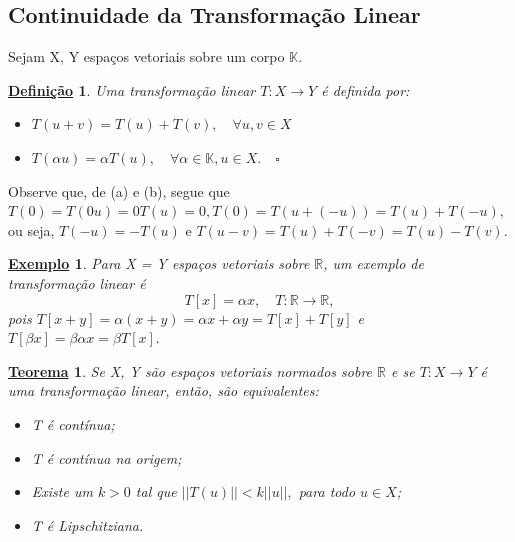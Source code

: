 \documentclass{article}
\newtheorem*{def*}{\underline{Defini\c c\~ao}}
\newtheorem*{theorem*}{\underline{Teorema}}
\newtheorem{example}{\underline{Exemplo}}
\begin{document}
\subsection{Continuidade da Transformação Linear}
  Sejam X, Y espaços vetoriais sobre um corpo \(\mathbb{K}\).
 \begin{def*}
   Uma transformação linear \(T:X\rightarrow Y\) é definida por:
 \begin{itemize}
   \item[a)] \(T(u+v)=T(u)+T(v),\quad \forall u, v\in X\)
   \item[b)] \(T(\alpha u) = \alpha T(u),\quad \forall \alpha \in \mathbb{K}, u\in X.\quad\square\)
 \end{itemize}
 \end{def*}
  Observe que, de (a) e (b), segue que \(T(0) = T(0u) = 0T(u) = 0, T(0) = T(u+(-u)) = T(u) + T(-u),\) ou seja,
 \(T(-u) = -T(u)\) e \(T(u-v) = T(u) + T(-v) = T(u) - T(v)\).
\begin{example}
  Para X = Y espaços vetoriais sobre \(\mathbb{R}\), um exemplo de transformação linear é 
    \[
      T[x] = \alpha x,\quad T:\mathbb{R}\rightarrow \mathbb{R},
    \]
    pois \(T[x+y] = \alpha (x+y) = \alpha x + \alpha y = T[x] + T[y]\) e \(T[\beta x] = \beta \alpha x = \beta T[x].\)
\end{example}
\begin{theorem*}
  Se X, Y são espaços vetoriais normados sobre \(\mathbb{R}\) e se \(T:X\rightarrow Y\) é uma transformação linear, então, são equivalentes:
 \begin{itemize}
   \item[a)] T é contínua;
   \item[b)] T é contínua na origem;
   \item[c)] Existe um \(k > 0\) tal que \(||T(u)|| < k||u||,\) para todo \(u\in X\);
   \item[d)] T é Lipschitziana.
 \end{itemize}
\end{theorem*}
\end{document}
